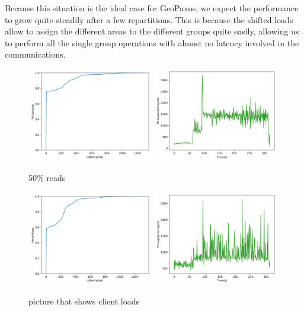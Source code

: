 Because this situation is the ideal case for GeoPaxos, we expect the performance to grow quite steadily after a few repartitions. This is because the shifted loads allow to assign the different areas to the different groups quite easily, allowing us to perform all the single group operations with almost no latency involved in the communications.

\begin{figure}[!htb]
  \centering
  \includegraphics[width=0.49\textwidth,height=\textheight,keepaspectratio]{img/local50_lat.png}
  \includegraphics[width=0.49\textwidth,height=\textheight,keepaspectratio]{img/local50_tp.png}
  \caption{ 50\% reads }
  \label{fig:local50-performance}
\end{figure}

\begin{figure}[!htb]
  \centering
  \includegraphics[width=0.49\textwidth,height=\textheight,keepaspectratio]{img/local10_lat.png}
  \includegraphics[width=0.49\textwidth,height=\textheight,keepaspectratio]{img/local10_tp.png}
  \caption{ picture that shows client loads }
  \label{fig:local10-performance}
\end{figure}

